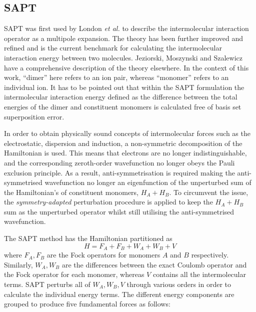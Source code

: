 


\subsection{SAPT}
SAPT was first used by London \emph{et al.}
\cite{Eisenschitz1930a}
to describe the intermolecular interaction operator as a multipole expansion. 
The theory has been further improved and refined and is the current benchmark for calculating the intermolecular interaction energy between two molecules.
Jeziorski, Moszynski and Szalewicz have a comprehensive description of the theory elsewhere. 
\cite{Jeziorski1994a}
In the context of this work, ``dimer'' here refers to an ion pair, whereas ``monomer'' refers to an individual ion.
It has to be pointed out that within the SAPT formulation the intermolecular interaction energy defined as the difference between the total energies of the dimer and constituent monomers is calculated free of basis set superposition error. 

In order to obtain physically sound concepts of intermolecular forces such as the electrostatic, dispersion and induction, a non-symmetric decomposition of the Hamiltonian is used.
This means that electrons are no longer indistinguishable, and the corresponding zeroth-order wavefunction no longer obeys the Pauli exclusion principle. 
As a result, anti-symmetrisation is required making the anti-symmetrised wavefunction no longer an eigenfunction of the unperturbed sum of the Hamiltonian's of constituent monomers, $H_A + H_B$.
To circumvent the issue, the \emph{symmetry-adapted} perturbation procedure is applied to keep the $H_A + H_B$ sum as the unperturbed operator whilst still utilising the anti-symmetrised wavefunction.


The SAPT method has the Hamiltonian partitioned as
\begin{equation}
    H = F_A + F_B + W_A + W_B + V
\end{equation}
where $ F_A, F_B $ are the Fock operators for monomers $A$ and $B$ respectively. 
Similarly, $W_A, W_B$ are the differences between the exact Coulomb operator and the Fock operator for each monomer, whereas $V$ contains all the intermolecular terms.
SAPT perturbs all of $W_A, W_B, V$ through various orders in order to calculate the individual energy terms.
The different energy components are grouped to produce five fundamental forces as follows:

